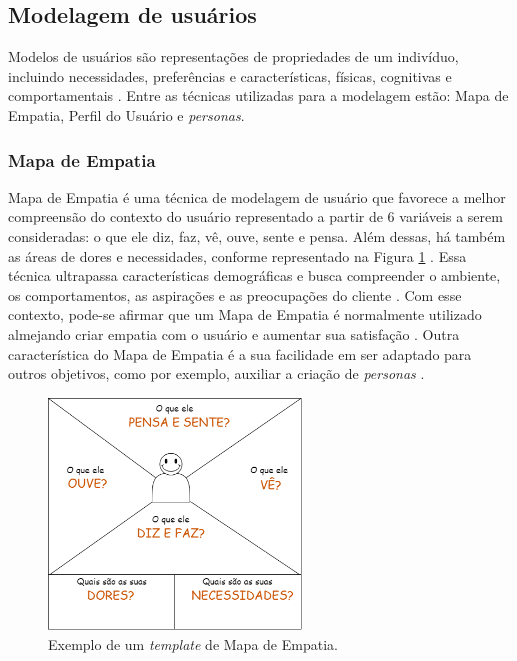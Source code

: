 \documentclass[12pt]{article}
\begin{document}
\subsection{Modelagem de usuários}
Modelos de usuários são representações de propriedades de um indivíduo, incluindo necessidades, preferências e características, físicas, cognitivas e comportamentais \cite{mohamad_kouroupetroglou}. Entre as técnicas utilizadas para a modelagem estão: Mapa de Empatia, Perfil do Usuário e \emph{personas}.

\subsubsection{Mapa de Empatia}
\par Mapa de Empatia é uma técnica de modelagem de usuário que favorece a melhor compreensão do contexto do usuário representado a partir de 6 variáveis a serem consideradas: o que ele diz, faz, vê, ouve, sente e pensa. Além dessas, há também as áreas de dores e necessidades, conforme representado na Figura \ref{fig:MapaEmpatia} \cite{gasca2014}. Essa técnica ultrapassa características demográficas e busca compreender o ambiente, os comportamentos, as aspirações e as preocupações do cliente \cite{7328012}. Com esse contexto, pode-se afirmar que um Mapa de Empatia é normalmente utilizado almejando criar empatia com o usuário e aumentar sua satisfação \cite{10.1145/3151470.3156642}. Outra característica do Mapa de Empatia é a sua facilidade em ser adaptado para outros objetivos, como por exemplo, auxiliar a criação de \emph{personas} \cite{7328012}.

\begin{figure}[H]
    \centering
    \includegraphics[width=0.6\textwidth]{images/Mapa_Empatia.png}
    \caption{Exemplo de um \emph{template} de Mapa de Empatia.}
    \label{fig:MapaEmpatia}
\end{figure}
\end{document}
